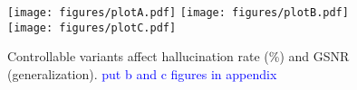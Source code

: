 \begin{figure}[htb]
    \centering
    \texttt{[image: figures/plotA.pdf]}
    \label{fig:weight}
    \texttt{[image: figures/plotB.pdf]}
    \label{fig:ratio}
    \texttt{[image: figures/plotC.pdf]}
    \label{fig:length}
    \label{fig:generalization-factors}
        \caption{Controllable variants affect hallucination rate (\%) and GSNR (generalization). \textcolor{blue}{put b and c figures in appendix}}
\end{figure}